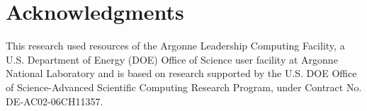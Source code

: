 \section{Acknowledgments \label{sec:Acknowledgments}}

This research used resources of the Argonne Leadership
Computing Facility, a U.S. Department of Energy (DOE)
Office of Science user facility at Argonne National Laboratory
and is based on research supported by the U.S. DOE Office
of Science-Advanced Scientific Computing Research Program,
under Contract No. DE-AC02-06CH11357.